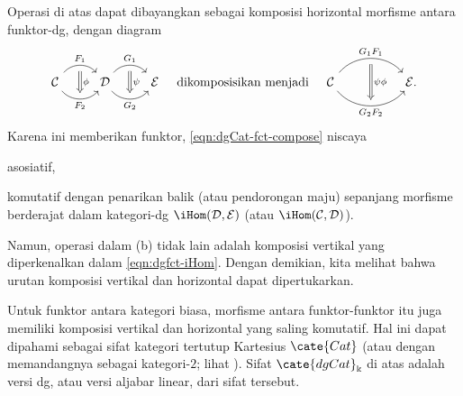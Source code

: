 \begin{remark}
	Operasi di atas dapat dibayangkan sebagai komposisi horizontal morfisme
	antara funktor-dg, dengan diagram
	\[ \begin{tikzcd}
		\mathcal{C} \arrow[bend left=50, r, "F_1", ""' name=LU] \arrow[bend right=50, r, "" name=LD, "F_2"'] &
		\mathcal{D} \arrow[bend left=50, r, "G_1", ""' name=RU] \arrow[bend right=50, r, "" name=RD, "G_2"'] &
		\arrow[Rightarrow, to path=(LU) -- (LD) \tikztonodes, "\phi"] \arrow[Rightarrow, to path=(RU) -- (RD) \tikztonodes, "\psi"] \mathcal{E}
	\end{tikzcd} \quad \text{dikomposisikan menjadi} \quad \begin{tikzcd}
		\mathcal{C}
		\arrow[bend left=50, rr, "G_1 F_1", ""' name=U]
		\arrow[bend right=50, rr, "" name=D, "G_2 F_2"']
		& & \arrow[Rightarrow, to path=(U) -- (D) \tikztonodes, "\psi \phi"] \mathcal{E} .
	\end{tikzcd} \]
	Karena ini memberikan funktor, \eqref{eqn:dgCat-fct-compose} niscaya
	\begin{inparaenum}[(a)]
		\item asosiatif,
		\item komutatif dengan penarikan balik (atau pendorongan maju) sepanjang
		morfisme berderajat dalam kategori-dg
		$\iHom(\mathcal{D},\mathcal{E})$ (atau
		$\iHom(\mathcal{C},\mathcal{D})$).
	\end{inparaenum}
	Namun, operasi dalam (b) tidak lain adalah komposisi vertikal yang
	diperkenalkan dalam \eqref{eqn:dgfct-iHom}. Dengan demikian, kita melihat
	bahwa urutan komposisi vertikal dan horizontal dapat dipertukarkan.

	Untuk funktor antara kategori biasa, morfisme antara funktor-funktor itu juga memiliki
	komposisi vertikal dan horizontal yang saling komutatif. Hal ini dapat
	dipahami sebagai sifat kategori tertutup Kartesius $\cate{Cat}$ (atau
	dengan memandangnya sebagai kategori-$2$; lihat
	\cite[Contoh 3.5.3]{Li1}). Sifat $\cate{dgCat}_{\Bbbk}$ di atas adalah versi
	dg, atau versi aljabar linear, dari sifat tersebut.
\end{remark}
